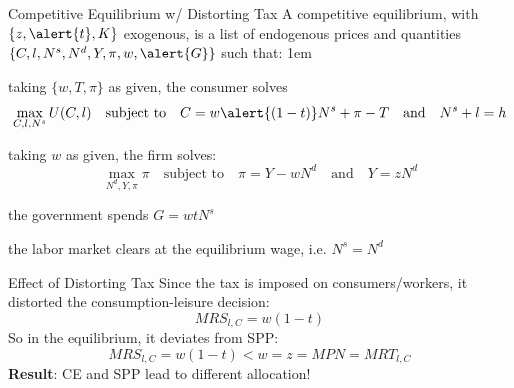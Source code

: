 \documentclass[11pt,aspectratio=43]{beamer}
\let\oldenumerate=\enumerate
\let\endoldenumerate=\endenumerate
\renewenvironment{enumerate}{\oldenumerate \itemsep1em}{ \endoldenumerate}
\theoremstyle{definition}
\begin{document}
\begin{frame}{Competitive Equilibrium w/ Distorting Tax}
\label{slide:Competitive_Equilibrium_w__Distortionary_Tax}
    A competitive equilibrium, with $ \{ z, \alert{t}, K \} $ exogenous, is a list of endogenous prices and quantities $ \{ C, l, N^{s}, N^{d}, Y, \pi, w, \alert{G} \} $ such that:
    \begin{enumerate}
        \item  taking $ \{ w, T, \pi \} $ as given, the consumer solves
        \begin{equation*}
            \max_{C, l, N^{s}} U( C, l )
            \quad \text{subject to} \quad
            C = w\alert{( 1-t )}N^{s} + \pi - T
            \quad \text{and} \quad
            N^{s} + l = h
        \end{equation*}
        \item taking $ w $ as given, the firm solves:
        \begin{equation*}
            \max_{N^{d}, Y, \pi} \pi
            \quad \text{subject to} \quad
            \pi = Y - w N^{d}
            \quad \text{and} \quad
            Y = z N^{d}
        \end{equation*}
        \item the government spends $ G = w t N^{s} $
        \item the labor market clears at the equilibrium wage, i.e. $ N^{s} = N^{d} $
    \end{enumerate}
\end{frame}

\begin{frame}{Effect of Distorting Tax}
\label{slide:Effect_of_Distorting_Tax}
    Since the tax is imposed on consumers/workers, it distorted the consumption-leisure decision:
    \begin{equation*}
        MRS_{l, C} = w( 1-t )
    \end{equation*}
    So in the equilibrium, it deviates from SPP:
    \begin{equation*}
        MRS_{l, C} = w( 1-t ) < w = z = MPN = MRT_{l, C}
    \end{equation*}
    \textbf{Result}: CE and SPP lead to different allocation!
\end{frame}
\end{document}
